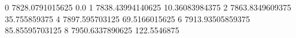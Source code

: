 0 7828.0791015625 0.0
1 7838.43994140625 10.36083984375
2 7863.8349609375 35.755859375
4 7897.595703125 69.5166015625
6 7913.93505859375 85.85595703125
8 7950.6337890625 122.5546875
